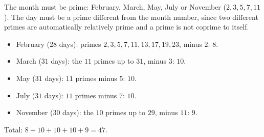 The month must be prime: February, March, May, July or November ($2,3,5,7,11$). The day must be a prime different from the month number, since two different primes are automatically relatively prime and a prime is not coprime to itself.
\begin{itemize}
\item February ($28$ days): primes $2,3,5,7,11,13,17,19,23$, minus $2$: $8$.
\item March ($31$ days): the $11$ primes up to $31$, minus $3$: $10$.
\item May ($31$ days): $11$ primes minus $5$: $10$.
\item July ($31$ days): $11$ primes minus $7$: $10$.
\item November ($30$ days): the $10$ primes up to $29$, minus $11$: $9$.
\end{itemize}
Total: $8+10+10+10+9=\boxed{47}$.
